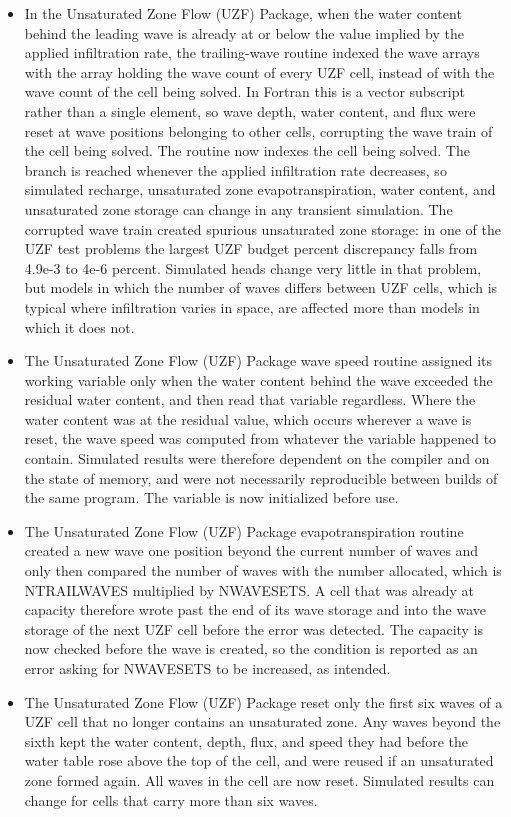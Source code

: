 \begin{itemize}
\item In the Unsaturated Zone Flow (UZF) Package, when the water content behind the leading wave is already at or below the value implied by the applied infiltration rate, the trailing-wave routine indexed the wave arrays with the array holding the wave count of every UZF cell, instead of with the wave count of the cell being solved. In Fortran this is a vector subscript rather than a single element, so wave depth, water content, and flux were reset at wave positions belonging to other cells, corrupting the wave train of the cell being solved. The routine now indexes the cell being solved. The branch is reached whenever the applied infiltration rate decreases, so simulated recharge, unsaturated zone evapotranspiration, water content, and unsaturated zone storage can change in any transient simulation. The corrupted wave train created spurious unsaturated zone storage: in one of the UZF test problems the largest UZF budget percent discrepancy falls from 4.9e-3 to 4e-6 percent. Simulated heads change very little in that problem, but models in which the number of waves differs between UZF cells, which is typical where infiltration varies in space, are affected more than models in which it does not.
\item The Unsaturated Zone Flow (UZF) Package wave speed routine assigned its working variable only when the water content behind the wave exceeded the residual water content, and then read that variable regardless. Where the water content was at the residual value, which occurs wherever a wave is reset, the wave speed was computed from whatever the variable happened to contain. Simulated results were therefore dependent on the compiler and on the state of memory, and were not necessarily reproducible between builds of the same program. The variable is now initialized before use.
\item The Unsaturated Zone Flow (UZF) Package evapotranspiration routine created a new wave one position beyond the current number of waves and only then compared the number of waves with the number allocated, which is NTRAILWAVES multiplied by NWAVESETS. A cell that was already at capacity therefore wrote past the end of its wave storage and into the wave storage of the next UZF cell before the error was detected. The capacity is now checked before the wave is created, so the condition is reported as an error asking for NWAVESETS to be increased, as intended.
\item The Unsaturated Zone Flow (UZF) Package reset only the first six waves of a UZF cell that no longer contains an unsaturated zone. Any waves beyond the sixth kept the water content, depth, flux, and speed they had before the water table rose above the top of the cell, and were reused if an unsaturated zone formed again. All waves in the cell are now reset. Simulated results can change for cells that carry more than six waves.

\end{itemize}
